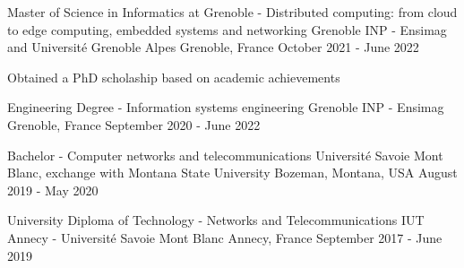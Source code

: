 

\begin{cventries}

\cventry
{Master of Science in Informatics at Grenoble - Distributed computing: from cloud to edge computing, embedded systems and networking} %
{Grenoble INP - Ensimag and Université Grenoble Alpes} %
{Grenoble, France} %
{October 2021 - June 2022} %
{
  \begin{cvitems}
    \item Obtained a PhD scholaship based on academic achievements
  \end{cvitems}
}

\cventry
{Engineering Degree - Information systems engineering} %
{Grenoble INP - Ensimag} %
{Grenoble, France} %
{September 2020 - June 2022} %
{
}

\cventry
{Bachelor - Computer networks and telecommunications} %
{Université Savoie Mont Blanc, exchange with Montana State University} %
{Bozeman, Montana, USA} %
{August 2019 - May 2020} %
{
}

\cventry
{University Diploma of Technology - Networks and Telecommunications} %
{IUT Annecy - Université Savoie Mont Blanc} %
{Annecy, France} %
{September 2017 - June 2019} %
{
}






\end{cventries}
